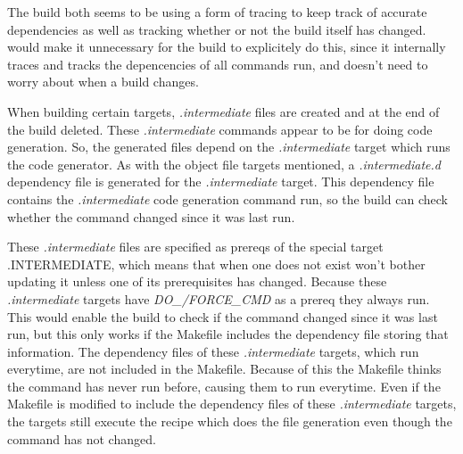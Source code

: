 
The build both seems to be using a form of tracing to keep track of accurate dependencies as well as tracking whether or not the build itself has changed.  \Rattle would make it unnecessary for the build to explicitely do this, since it internally traces and tracks the depencencies of all commands run, and doesn't need to worry about when a build changes.





When building certain targets, \emph{.intermediate} files are created and at the end of the build deleted.  These \emph{.intermediate} commands appear to be for doing code generation.  So, the generated files depend on the \emph{.intermediate} target which runs the code generator.  As with the object file targets mentioned, a \emph{.intermediate.d} dependency file is generated for the \emph{.intermediate} target.  This dependency file contains the \emph{.intermediate} code generation command run, so the build can check whether the command changed since it was last run.

These \emph{.intermediate} files are specified as prereqs of the special \Make target {.INTERMEDIATE}, which means that when one does not exist \Make won't bother updating it unless one of its prerequisites has changed.  Because these \emph{.intermediate} targets have \emph{DO\_/FORCE\_CMD} as a prereq they always run.  This would enable the build to check if the command changed since it was last run, but this only works if the Makefile includes the dependency file storing that information.  The dependency files of these \emph{.intermediate} targets, which run everytime, are not included in the Makefile.  Because of this the Makefile thinks the command has never run before, causing them to run everytime.  Even if the Makefile is modified to include the dependency files of these \emph{.intermediate} targets, the targets still execute the recipe which does the file generation even though the command has not changed. %

